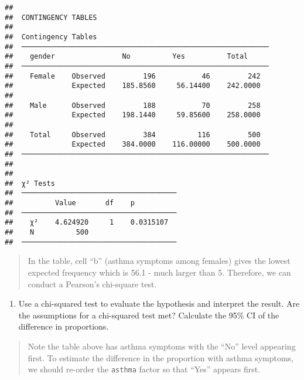 \documentclass[
]{memoir}
\newenvironment{Shaded}{\begin{snugshade}}{\end{snugshade}}
\newcommand{\FunctionTok}[1]{\textcolor[rgb]{0.00,0.00,0.00}{#1}}
\newcommand{\NormalTok}[1]{#1}
\newcommand{\SpecialCharTok}[1]{\textcolor[rgb]{0.00,0.00,0.00}{#1}}
\providecommand{\tightlist}{%
  \setlength{\itemsep}{0pt}\setlength{\parskip}{0pt}}
\begin{document}
\begin{verbatim}
## 
##  CONTINGENCY TABLES
## 
##  Contingency Tables                                          
##  ─────────────────────────────────────────────────────────── 
##    gender                No          Yes          Total      
##  ─────────────────────────────────────────────────────────── 
##    Female    Observed         196           46         242   
##              Expected    185.8560     56.14400    242.0000   
##                                                              
##    Male      Observed         188           70         258   
##              Expected    198.1440     59.85600    258.0000   
##                                                              
##    Total     Observed         384          116         500   
##              Expected    384.0000    116.00000    500.0000   
##  ─────────────────────────────────────────────────────────── 
## 
## 
##  χ² Tests                              
##  ───────────────────────────────────── 
##          Value       df    p           
##  ───────────────────────────────────── 
##    χ²    4.624920     1    0.0315107   
##    N          500                      
##  ─────────────────────────────────────
\end{verbatim}

\begin{quote}
In the table, cell ``b'' (asthma symptoms among females) gives the lowest expected frequency which is 56.1 - much larger than 5. Therefore, we can conduct a Pearson's chi-square test.
\end{quote}

\begin{enumerate}
\def\labelenumi{\alph{enumi})}
\setcounter{enumi}{1}
\tightlist
\item
  Use a chi-squared test to evaluate the hypothesis and interpret the result. Are the assumptions for a chi-squared test met? Calculate the 95\% CI of the difference in proportions.
\end{enumerate}

\begin{quote}
Note the table above has asthma symptoms with the ``No'' level appearing first. To estimate the difference in the proportion with asthma symptoms, we should re-order the \texttt{asthma} factor so that ``Yes'' appears first.
\end{quote}

\begin{Shaded}
\end{Shaded}
\end{document}

